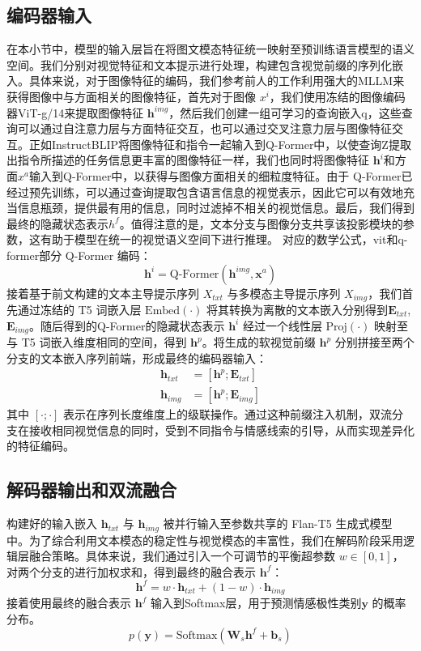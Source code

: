 \subsection{编码器输入}
在本小节中，模型的输入层旨在将图文模态特征统一映射至预训练语言模型的语义空间。我们分别对视觉特征和文本提示进行处理，构建包含视觉前缀的序列化嵌入。具体来说，对于图像特征的编码，我们参考前人的工作利用强大的MLLM来获得图像中与方面相关的图像特征，首先对于图像 $x^i$，我们使用冻结的图像编码器ViT-g/14来提取图像特征 $\mathbf{h}^{img}$，然后我们创建一组可学习的查询嵌入q，这些查询可以通过自注意力层与方面特征交互，也可以通过交叉注意力层与图像特征交互。正如InstructBLIP将图像特征和指令一起输入到Q-Former中，以使查询Z提取出指令所描述的任务信息更丰富的图像特征一样，我们也同时将图像特征 $\mathbf{h}^{i}$和方面$x^a$输入到Q-Former中，以获得与图像方面相关的细粒度特征。由于 Q-Former已经过预先训练，可以通过查询提取包含语言信息的视觉表示，因此它可以有效地充当信息瓶颈，提供最有用的信息，同时过滤掉不相关的视觉信息。最后，我们得到最终的隐藏状态表示$h^f$。值得注意的是，文本分支与图像分支共享该投影模块的参数，这有助于模型在统一的视觉语义空间下进行推理。
对应的数学公式，vit和q-former部分
Q-Former 编码：
\begin{equation}
\mathbf{h}^{i} = \text{Q-Former}(\mathbf{h}^{img}, \mathbf{x}^{a})
\end{equation}
接着基于前文构建的文本主导提示序列 $X_{txt}$ 与多模态主导提示序列 $X_{img}$，我们首先通过冻结的 T5 词嵌入层 $\text{Embed}(\cdot)$ 将其转换为离散的文本嵌入分别得到$\mathbf{E}_{txt}$,$\mathbf{E}_{img}$。随后得到的Q-Former的隐藏状态表示 $\mathbf{h}^{i}$ 经过一个线性层 $\text{Proj}(\cdot)$ 映射至与 T5 词嵌入维度相同的空间，得到 $\mathbf{h}^{p}$。将生成的软视觉前缀 $\mathbf{h}^{p}$ 分别拼接至两个分支的文本嵌入序列前端，形成最终的编码器输入：
\begin{equation}
\begin{aligned}
\mathbf{h}_{txt} &= [\mathbf{h}^{p}; \mathbf{E}_{txt}] \\
\mathbf{h}_{img} &= [\mathbf{h}^{p}; \mathbf{E}_{img}]
\end{aligned}
\end{equation}
其中 $[\cdot ; \cdot]$ 表示在序列长度维度上的级联操作。通过这种前缀注入机制，双流分支在接收相同视觉信息的同时，受到不同指令与情感线索的引导，从而实现差异化的特征编码。
 

\subsection{解码器输出和双流融合}
构建好的输入嵌入 $\mathbf{h}_{txt}$ 与 $\mathbf{h}_{img}$ 被并行输入至参数共享的 Flan-T5 生成式模型中。为了综合利用文本模态的稳定性与视觉模态的丰富性，我们在解码阶段采用逻辑层融合策略。具体来说，我们通过引入一个可调节的平衡超参数 $w \in [0, 1]$，对两个分支的进行加权求和，得到最终的融合表示 $\mathbf{h}^{f}$：
\begin{equation}
\mathbf{h}^{f} = w \cdot \mathbf{h}_{txt} + (1 - w) \cdot \mathbf{h}_{img}
\end{equation}
接着使用最终的融合表示 $\mathbf{h}^{f}$ 输入到Softmax层，用于预测情感极性类别$\mathbf{y}$ 的概率分布。
\begin{equation}
    p(\mathbf{y})=\text{Softmax}(\mathbf{W}_s \mathbf{h}^f+\mathbf{b}_s)
\end{equation}

